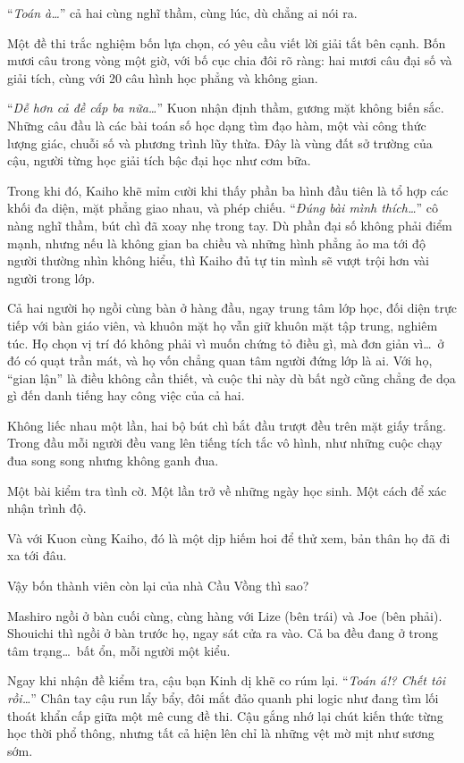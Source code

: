 \documentclass[../main.tex]{subfiles}
\begin{document}
``\textit{Toán à\dots}'' cả hai cùng nghĩ thầm, cùng lúc, dù chẳng ai nói ra.

Một đề thi trắc nghiệm bốn lựa chọn, có yêu cầu viết lời giải tắt bên cạnh. Bốn mươi câu trong vòng một giờ, với bố cục chia đôi rõ ràng: hai mươi câu đại số và giải tích, cùng với 20 câu hình học phẳng và không gian.

``\textit{Dễ hơn cả đề cấp ba nữa\dots}'' Kuon nhận định thầm, gương mặt không biến sắc. Những câu đầu là các bài toán số học dạng tìm đạo hàm, một vài công thức lượng giác, chuỗi số và phương trình lũy thừa. Đây là vùng đất sở trường của cậu, người từng học giải tích bậc đại học như cơm bữa.

Trong khi đó, Kaiho khẽ mỉm cười khi thấy phần ba hình đầu tiên là tổ hợp các khối đa diện, mặt phẳng giao nhau, và phép chiếu. ``\textit{Đúng bài mình thích\dots}'' cô nàng nghĩ thầm, bút chì đã xoay nhẹ trong tay. Dù phần đại số không phải điểm mạnh, nhưng nếu là không gian ba chiều và những hình phẳng ảo ma tới độ người thường nhìn không hiểu, thì Kaiho đủ tự tin mình sẽ vượt trội hơn vài người trong lớp.

Cả hai người họ ngồi cùng bàn ở hàng đầu, ngay trung tâm lớp học, đối diện trực tiếp với bàn giáo viên, và khuôn mặt họ vẫn giữ khuôn mặt tập trung, nghiêm túc. Họ chọn vị trí đó không phải vì muốn chứng tỏ điều gì, mà đơn giản vì\dots\ ở đó có quạt trần mát, và họ vốn chẳng quan tâm người đứng lớp là ai. Với họ, ``gian lận'' là điều không cần thiết, và cuộc thi này dù bất ngờ cũng chẳng đe dọa gì đến danh tiếng hay công việc của cả hai.

Không liếc nhau một lần, hai bộ bút chì bắt đầu trượt đều trên mặt giấy trắng. Trong đầu mỗi người đều vang lên tiếng tích tắc vô hình, như những cuộc chạy đua song song nhưng không ganh đua.

Một bài kiểm tra tình cờ. Một lần trở về những ngày học sinh. Một cách để xác nhận trình độ.

Và với Kuon cùng Kaiho, đó là một dịp hiếm hoi để thử xem, bản thân họ đã đi xa tới đâu.

Vậy bốn thành viên còn lại của nhà Cầu Vồng thì sao?

Mashiro ngồi ở bàn cuối cùng, cùng hàng với Lize (bên trái) và Joe (bên phải). Shouichi thì ngồi ở bàn trước họ, ngay sát cửa ra vào. Cả ba đều đang ở trong tâm trạng\dots\ bất ổn, mỗi người một kiểu.

Ngay khi nhận đề kiểm tra, cậu bạn Kinh dị khẽ co rúm lại. ``\textit{Toán á!? Chết tôi rồi\dots}'' Chân tay cậu run lẩy bẩy, đôi mắt đảo quanh phi logic như đang tìm lối thoát khẩn cấp giữa một mê cung đề thi. Cậu gắng nhớ lại chút kiến thức từng học thời phổ thông, nhưng tất cả hiện lên chỉ là những vệt mờ mịt như sương sớm.
\end{document}
